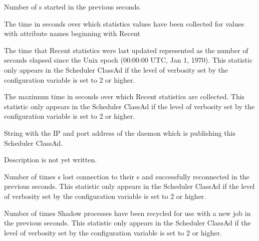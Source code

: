\begin{description}
\item[\AdAttr{RecentShadowsStarted}:] Number of s started
  in the previous  seconds.

\item[\AdAttr{RecentStatsLifetime}:] The time in seconds over which statistics values have been collected 
  for values with attribute names beginning with Recent

\item[\AdAttr{RecentStatsTickTime}:] The time that Recent statistics were last updated
  represented as the number of seconds elapsed since
    the Unix epoch (00:00:00 UTC, Jan 1, 1970).
  This statistic only appears in the Scheduler ClassAd if the level of
  verbosity set by the configuration variable 
  is set to 2 or higher.

\item[\AdAttr{RecentWindowMax}:] The maximum time in seconds over which Recent statistics are collected.
  This statistic only appears in the Scheduler ClassAd if the level of
  verbosity set by the configuration variable 
  is set to 2 or higher.

\item[\AdAttr{ScheddIpAddr}:] String with the IP and port address of the
 daemon which is publishing this Scheduler ClassAd.

\item[\AdAttr{ServerTime}:] Description is not yet written.

\item[\AdAttr{ShadowsReconnections}:] Number of times s lost 
  connection to their s and successfully reconnected
  in the previous  seconds.
  This statistic only appears in the Scheduler ClassAd if the level of
  verbosity set by the configuration variable 
  is set to 2 or higher.

\item[\AdAttr{ShadowsRecycled}:] Number of times Shadow processes have been 
  recycled for use with a new job
  in the previous  seconds.
  This statistic only appears in the Scheduler ClassAd if the level of
  verbosity set by the configuration variable 
  is set to 2 or higher.


\end{description}
